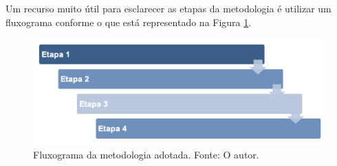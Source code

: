 Um recurso muito útil para esclarecer as etapas da metodologia é utilizar um fluxograma conforme o que está representado na Figura \ref{fig:FluxogramaMetodologia}.
        \begin{figure}[h]
            \vspace{0.2cm}
            \centering
            \includegraphics[width= \textwidth]{Imgs/Metodologia/fluxogramaMetodologia.png}
            \caption[Fluxograma da metodologia adotada.]{Fluxograma da metodologia adotada. Fonte: O autor.} 
           \label{fig:FluxogramaMetodologia}
            \vspace{0.2cm}
        \end{figure}